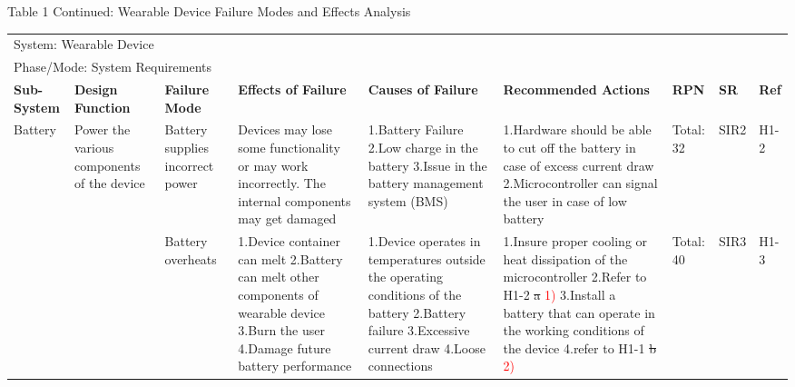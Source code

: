 \documentclass[12pt, titlepage]{article}
\begin{document}
\begin{landscape}
\begin{table}[H]
\end{table}
    
\begin{table}[H]
    \centering
        Table 1 Continued: Wearable Device Failure Modes and Effects Analysis

        \begin{tabular}{| p{} | p{}  | p{} | p{} | p{} | p{} | p{} | p{} | p{} |}
        \hline
        
        \multicolumn{9}{|l|}{System: Wearable Device} \\
        \multicolumn{9}{|l|}{Phase/Mode: System Requirements} \\ \hline
        \textbf{Sub-System} & \textbf{Design Function} & \textbf{Failure Mode} & \textbf{Effects of Failure} & \textbf{Causes of Failure} & \textbf{Recommended Actions} & \textbf{RPN} & \textbf{SR} & \textbf{Ref} \\ \hline

        Battery & Power the various components of the device & Battery supplies incorrect power & Devices may lose some functionality or may work incorrectly. The internal components may get damaged & 1.Battery Failure \newline 2.Low charge in the battery \newline 3.Issue in the battery management system (BMS) & 1.Hardware should be able to cut off the battery in case of excess current draw \newline 2.Microcontroller can signal the user in case of low battery & Total: 32 & SIR2 & H1-2 \\ \cline{3-9}

        & &  Battery overheats & 1.Device container can melt \newline 2.Battery can melt other components of wearable device \newline 3.Burn the user \newline 4.Damage future battery performance & 1.Device operates in temperatures outside the operating conditions of the battery \newline 2.Battery failure \newline 3.Excessive current draw \newline 4.Loose connections  & 1.Insure proper cooling or heat dissipation of the microcontroller \newline 2.Refer to H1-2 \sout{a} \textcolor{red}{1)} \newline 3.Install a battery that can operate in the working conditions of the device \newline 4.refer to H1-1 \sout{b} \textcolor{red}{2)} & Total: 40 & SIR3 & H1-3 \\ \hline


\end{tabular}
\end{table}
\end{landscape}
\end{document}
